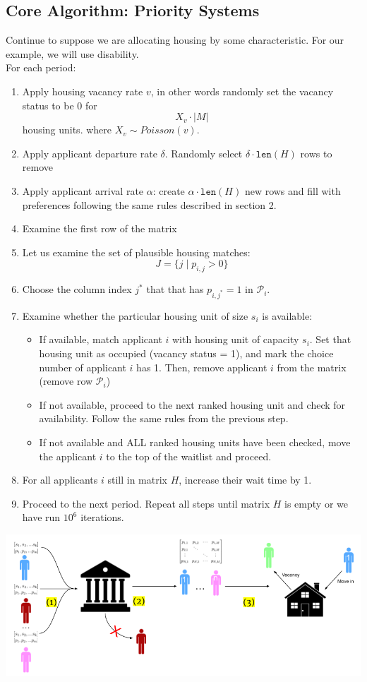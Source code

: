\documentclass[11pt]{article}
\begin{document}
\subsection{Core Algorithm: Priority Systems}
Continue to suppose we are allocating housing by some characteristic. For our example, we will use disability.\\
\newline
For each period:
\begin{enumerate}
    \item Apply housing vacancy rate $v$, in other words randomly set the vacancy status to be $0$ for
    \[X_v \cdot |M|\]
    housing units.
    where $X_v \sim Poisson(v)$.
    \item Apply applicant departure rate $\delta$. Randomly select $\delta \cdot \texttt{len}(H)$ rows to remove
    \item Apply applicant arrival rate $\alpha$: create $\alpha \cdot \texttt{len}(H)$ new rows and fill with preferences following the same rules described in section 2.
    \item Examine the first row of the matrix
    \item Let us examine the set of plausible housing matches:
    \[J = \{j \mid p_{i,j} > 0\}\]
    \item Choose the column index $j^*$ that that has $p_{i,j^*} = 1$ in $\mathcal{P}_i$.
    \item Examine whether the particular housing unit of size $s_i$ is available:
        \begin{itemize}
        \item If available, match applicant $i$ with housing unit of capacity $s_i$. Set that housing unit as occupied (vacancy status = 1), and mark the choice number of applicant $i$ has 1. Then, remove applicant $i$ from the matrix (remove row $\mathcal{P}_i$)
        \item If not available, proceed to the next ranked housing unit and check for availability. Follow the same rules from the previous step.
        \item If not available and ALL ranked housing units have been checked, move the applicant $i$ to the top of the waitlist and proceed. 
    \end{itemize}
    \item For all applicants $i$ still in matrix $H$, increase their wait time by 1. 
    \item Proceed to the next period. Repeat all steps until matrix $H$ is empty or we have run $10^6$ iterations.
\end{enumerate}
\begin{center}
    \includegraphics[scale=0.44]{doc/Setup Image.png}
\end{center}
\end{document}
